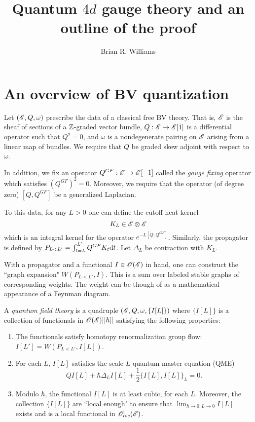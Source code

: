 \documentclass[11pt]{amsart}
\title{Quantum $4d$ gauge theory and an outline of the proof}
\author{Brian R. Williams}
\date{}
\begin{document}
\maketitle
 
\section{An overview of BV quantization}

Let $(\mathscr E, Q, \omega)$ prescribe the data of a classical free BV theory. 
That is, $\mathscr E$ is the sheaf of sections of a $\mathbb Z$-graded vector bundle, $Q : \mathscr E \to \mathscr E[1]$ is a differential operator such that $Q^2 = 0$, and $\omega$ is a nondegenerate pairing on $\mathscr E$ arising from a linear map of bundles. 
We require that $Q$ be graded skew adjoint with respect to $\omega$. 

In addition, we fix an operator $Q^{GF} : \mathscr E \to \mathscr E[-1]$ called the {\em gauge fixing} operator which satisfies $(Q^{GF})^2 = 0$.
Moreover, we require that the operator (of degree zero) $[Q,Q^{GF}]$ be a generalized Laplacian. 

To this data, for any $L > 0$ one can define the cutoff heat kernel 
\[
K_L \in \mathscr E \otimes \mathscr E
\]
which is an integral kernel for the operator $e^{-L[Q,Q^{GF}]}$. 
Similarly, the propagator is defined by $P_{L < L'} = \int_{t=L}^{L'} Q^{GF} K_t {\rm d} t$. 
Let $\Delta_L$ be contraction with $K_L$. 

With a propagator and a functional $I \in \mathscr O(\mathscr E)$ in hand, one can construct the ``graph expansion" $W(P_{L < L'}, I)$.
This is a sum over labeled stable graphs of corresponding weights. 
The weight can be though of as a mathematical appearance of a Feynman diagram. 

\begin{dfn}
A {\em quantum field theory} is a quadruple $(\mathscr E, Q, \omega, \{I[L]\})$ where $\{I[L]\}$ is a collection of functionals in $\mathscr O(\mathscr E)[[\hbar]]$ satisfying the following properties:
\begin{enumerate}
\item The functionals satisfy homotopy renormalization group flow: $I [L'] = W(P_{L<L'} , I[L])$. 
\item For each $L$, $I[L]$ satisfies the scale $L$ quantum master equation (QME)
\[
Q I[L] + \hbar \Delta_L I[L] + \frac{1}{2} \{I[L], I[L]\}_L = 0 .
\]
\item Modulo $\hbar$, the functional $I[L]$ is at least cubic, for each $L$. 
Moreover, the collection $\{I[L]\}$ are ``local enough" to ensure that $\lim_{\hbar \to 0, L \to 0} I[L]$ exists and is a local functional in $\mathscr O_{loc}(\mathscr E)$. 
\end{enumerate}
\end{dfn}
\end{document}
